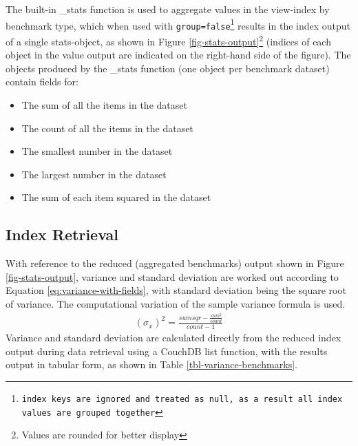The built-in \_stats function is used to aggregate values in the view-index by benchmark type, which when used with \texttt{group=false\footnote{index keys are ignored and treated as \texttt{null}, as a result all index values are grouped together}} results in the index output of a single stats-object, as shown in Figure \ref{fig-stats-output}\footnote{Values are rounded for better display} (indices of each object in the value output are indicated on the right-hand side of the figure). The objects produced by the \_stats function (one object per benchmark dataset) contain fields for:

\begin{itemize}
    \item The sum of all the items in the dataset
    \item The count of all the items in the dataset
    \item The smallest number in the dataset
    \item The largest number in the dataset
    \item The sum of each item squared in the dataset
\end{itemize}



\subsection{Index Retrieval}
With reference to the reduced (aggregated benchmarks) output shown in Figure \ref{fig-stats-output}, variance and standard deviation are worked out according to Equation \ref{eq:variance-with-fields}, with standard deviation being the square root of variance. The computational variation of the sample variance formula is used.
\begin{align}
    (\sigma_{\overline{x}})^{2} =  \frac{sumsqr - \frac{sum^2}{count}}{count - 1}\label{eq:variance-with-fields}
\end{align}
Variance and standard deviation are calculated directly from the reduced index output during data retrieval using a CouchDB list function, with the results output in tabular form, as shown in Table \ref{tbl-variance-benchmarks}.